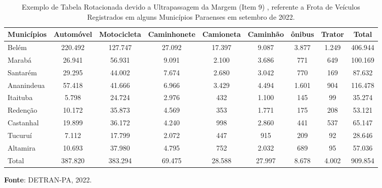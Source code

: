 \begin{table}
\centering
    {
\caption{Exemplo de Tabela Rotacionada devido a Ultrapassagem da Margem (Item 9) , referente a Frota de Veículos Registrados em alguns Municípios Paraenses em setembro de 2022.}
\label{tabelarotacionada}
    \vspace{0.2cm}
\begin{tabular}{l|c|c|c|c|c|c|c|c}
\hline
Municípios & Automóvel & Motocicleta & Caminhonete  & Camioneta & Caminhão  & ônibus & Trator & Total     \\
\hline\hline
Belém      & 220.492  & 127.747      & 27.092       & 17.397    & 9.087     & 3.877  & 1.249  & 406.944   \\
Marabá     & 26.941   & 56.931       & 9.091        & 2.100  & 3.686     & 771      & 649     & 100.169   \\
Santarém   & 29.295   & 44.002       & 7.674        & 2.680  & 3.042     & 770      & 169     & 87.632    \\ 
Ananindeua & 57.418   & 41.666       & 6.966        & 3.429  & 4.494     & 1.601    & 904     & 116.478   \\  
Itaituba   & 5.798    & 24.724       & 2.976        & 432    & 1.100     & 145      & 99      & 35.274    \\  
Redenção   & 10.172   & 35.873       & 4.569        & 353    & 1.771     & 175      & 208     & 53.121    \\
Castanhal  & 19.899   & 36.172       & 4.240        & 998    & 2.860     & 441      & 537     &  65.147    \\
Tucuruí    & 7.112    & 17.799       & 2.072        & 447    & 915       & 209      & 92      &  28.646    \\
Altamira   & 10.693   & 37.980       & 4.795        & 752    & 2.032     & 689      & 95      &  57.036   \\
\hline
  Total    & 387.820  & 383.294      & 69.475      & 28.588  & 27.997    & 8.678    & 4.002   &  909.854  \\
\hline\hline 
\end{tabular}} 
\begin{flushleft}
\hspace{0.2cm}
\textbf{Fonte}: DETRAN-PA, 2022. 
\end{flushleft}
\end{table}




